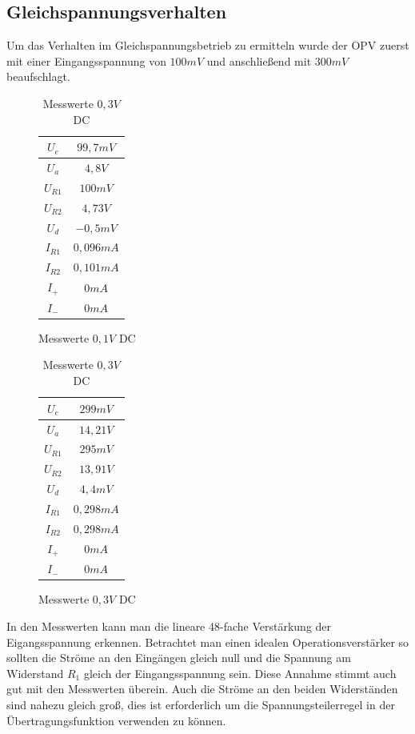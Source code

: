 \subsection{Gleichspannungsverhalten}

Um das Verhalten im Gleichspannungsbetrieb zu ermitteln wurde der OPV zuerst mit einer Eingangsspannung von $100mV$ und anschließend
mit $300mV$ beaufschlagt.\\

\begin{table}[H]
\begin{minipage}{.5\textwidth}
\begin{figure}[H]
\centering
 \begin{tabular}{c|c}
  $U_e$ & $99,7mV$ \\ \hline
  $U_a$ & $4,8V$ \\ \hline
  $U_{R1}$ & $100mV$ \\ \hline
  $U_{R2}$ & $4,73V$ \\ \hline
  $U_d$ & $-0,5mV$ \\ \hline
  $I_{R1}$ & $0,096mA$ \\ \hline
  $I_{R2}$ & $0,101mA$ \\ \hline
  $I_+$ & $0mA$ \\ \hline
  $I_-$ & $0mA$ \\
 \end{tabular}
  \caption{Messwerte $0,1V$ DC}
\end{figure}
\end{minipage}
\begin{minipage}{.5\textwidth}
\begin{figure}[H]
  \centering
 \begin{tabular}{c|c}
  $U_e$ & $299mV$ \\ \hline
  $U_a$ & $14,21V$ \\ \hline
  $U_{R1}$ & $295mV$ \\ \hline
  $U_{R2}$ & $13,91V$ \\ \hline
  $U_d$ & $4,4mV$ \\ \hline
  $I_{R1}$ & $0,298mA$ \\ \hline
  $I_{R2}$ & $0,298mA$ \\ \hline
  $I_+$ & $0mA$ \\ \hline
  $I_-$ & $0mA$ \\
 \end{tabular}
 \caption{Messwerte $0,3V$ DC}
\end{figure}
\end{minipage}
\end{table}
\noindent
In den Messwerten kann man die lineare 48-fache Verstärkung der Eigangsspannung erkennen. Betrachtet man einen
idealen Operationsverstärker so sollten die Ströme an den Eingängen gleich null und die Spannung am Widerstand $R_1$
gleich der Eingangsspannung sein. Diese Annahme stimmt auch gut mit den Messwerten überein. Auch die Ströme an den
beiden Widerständen sind nahezu gleich groß, dies ist erforderlich um die Spannungsteilerregel in der Übertragungsfunktion
verwenden zu können.\\

